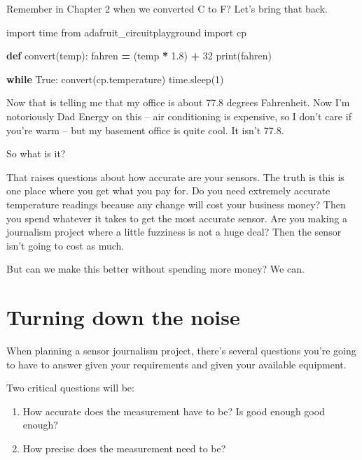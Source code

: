 \documentclass[
]{book}
\newenvironment{Shaded}{\begin{snugshade}}{\end{snugshade}}
\newcommand{\BuiltInTok}[1]{#1}
\newcommand{\ControlFlowTok}[1]{\textcolor[rgb]{0.13,0.29,0.53}{\textbf{#1}}}
\newcommand{\DecValTok}[1]{\textcolor[rgb]{0.00,0.00,0.81}{#1}}
\newcommand{\FloatTok}[1]{\textcolor[rgb]{0.00,0.00,0.81}{#1}}
\newcommand{\ImportTok}[1]{#1}
\newcommand{\KeywordTok}[1]{\textcolor[rgb]{0.13,0.29,0.53}{\textbf{#1}}}
\newcommand{\NormalTok}[1]{#1}
\newcommand{\OperatorTok}[1]{\textcolor[rgb]{0.81,0.36,0.00}{\textbf{#1}}}
\newcommand{\VariableTok}[1]{\textcolor[rgb]{0.00,0.00,0.00}{#1}}
\providecommand{\tightlist}{%
  \setlength{\itemsep}{0pt}\setlength{\parskip}{0pt}}
\begin{document}
Remember in Chapter 2 when we converted C to F? Let's bring that back.

\begin{Shaded}
\begin{Highlighting}[]
\ImportTok{import}\NormalTok{ time}
\ImportTok{from}\NormalTok{ adafruit_circuitplayground }\ImportTok{import}\NormalTok{ cp}

\KeywordTok{def}\NormalTok{ convert(temp):}
\NormalTok{    fahren }\OperatorTok{=}\NormalTok{ (temp }\OperatorTok{*} \FloatTok{1.8}\NormalTok{) }\OperatorTok{+} \DecValTok{32} 
    \BuiltInTok{print}\NormalTok{(fahren) }

\ControlFlowTok{while} \VariableTok{True}\NormalTok{:}
\NormalTok{    convert(cp.temperature)}
\NormalTok{    time.sleep(}\DecValTok{1}\NormalTok{)}
\end{Highlighting}
\end{Shaded}

Now that is telling me that my office is about 77.8 degrees Fahrenheit. Now I'm notoriously Dad Energy on this -- air conditioning is expensive, so I don't care if you're warm -- but my basement office is quite cool. It isn't 77.8.

So what is it?

That raises questions about how accurate are your sensors. The truth is this is one place where you get what you pay for. Do you need extremely accurate temperature readings because any change will cost your business money? Then you spend whatever it takes to get the most accurate sensor. Are you making a journalism project where a little fuzziness is not a huge deal? Then the sensor isn't going to cost as much.

But can we make this better without spending more money? We can.

\hypertarget{turning-down-the-noise}{%
\section{Turning down the noise}\label{turning-down-the-noise}}

When planning a sensor journalism project, there's several questions you're going to have to answer given your requirements and given your available equipment.

Two critical questions will be:

\begin{enumerate}
\def\labelenumi{\arabic{enumi}.}
\tightlist
\item
  How accurate does the measurement have to be? Is good enough good enough?
\item
  How precise does the measurement need to be?
\end{enumerate}
\end{document}

